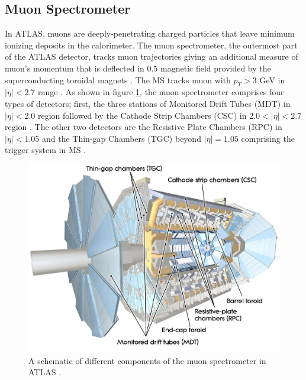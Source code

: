 \subsection{Muon Spectrometer}
\label{subsec:MS}
In ATLAS, muons are deeply-penetrating charged particles that leave minimum ionizing deposits in the calorimeter. The muon spectrometer, the outermost part of the ATLAS detector, tracks muon trajectories giving an additional measure of muon's momentum that is deflected in $0.5$ magnetic field provided by the superconducting toroidal magnets \cite{ATLAS}. The MS tracks muon with $p_{T} > 3$ GeV in $|\eta| < 2.7$ range \cite{ATLAS}. As shown in figure \ref{fig:ATLAS_MS}, the muon spectrometer comprises four types of detectors; first, the three stations of Monitored Drift Tubes (MDT) in $|\eta| < 2.0$ region followed by the Cathode Strip Chambers (CSC) in  $2.0 < |\eta| < 2.7$ region \cite{ATLAS}. The other two detectors are the Resistive Plate Chambers (RPC) in $|\eta| < 1.05$ and the Thin-gap Chambers (TGC) beyond $|\eta| = 1.05$ comprising the trigger system in MS \cite{ATLAS}. 

\begin{figure}
    \centering
    \includegraphics[width=.98\linewidth]{figures/LHC/ATLAS_MS.jpeg}
    \caption{ A schematic of different components of the muon spectrometer in ATLAS \cite{ATLAS}.\label{fig:ATLAS_MS}}
\end{figure}